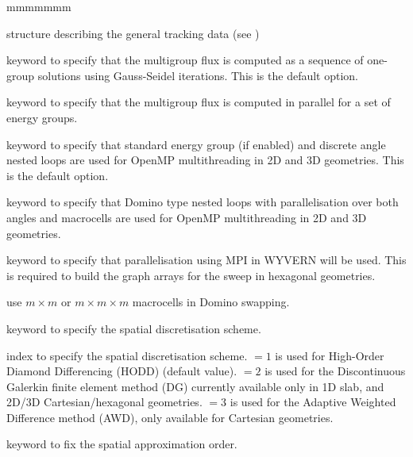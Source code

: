 \begin{ListeDeDescription}{mmmmmmm}

\item[\dstr{desctrack}] structure describing the general tracking data (see
)

\item[\moc{ONEG}] keyword to specify that the multigroup flux is computed as a sequence of one-group solutions using Gauss-Seidel iterations. This is the default option.

\item[\moc{ALLG}] keyword to specify that the multigroup flux is computed in parallel for a set of energy groups.

\item[\moc{OMPA}] keyword to specify that standard energy group (if  enabled) and discrete angle nested loops are used for OpenMP
multithreading in 2D and 3D geometries. This is the default option.

\item[\moc{OMPM}] keyword to specify that Domino type nested loops with parallelisation over both angles and macrocells are used for OpenMP multithreading in 2D and 3D geometries.\cite{domino}

\item[\moc{MPIM}] keyword to specify that parallelisation using MPI in WYVERN will be used. This is required to build the graph arrays for the sweep in hexagonal geometries.

\item[\dusa{m}] use $m\times m$ or $m \times m \times m$ macrocells in Domino swapping.

\item[\moc{SCHM}] keyword to specify the spatial discretisation scheme. 

\item[\dusa{ischm}] index to specify the spatial discretisation scheme.  $=1$ is used for High-Order Diamond Differencing (HODD) (default value).  $=2$ is used for the Discontinuous Galerkin finite element method (DG) currently available only in 1D slab, and 2D/3D Cartesian/hexagonal geometries.  $=3$ is used for the Adaptive Weighted Difference method (AWD), only available for Cartesian geometries.

\item[\moc{DIAM}] keyword to fix the spatial approximation order.


\end{ListeDeDescription}
